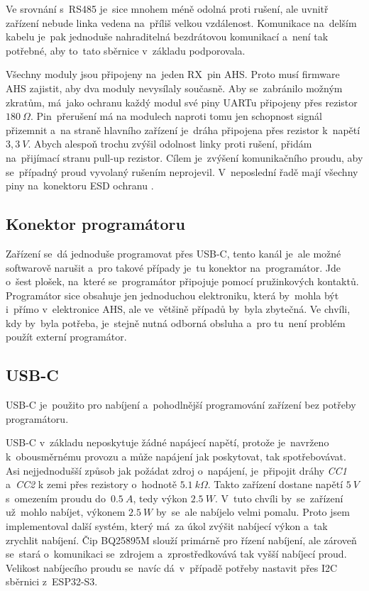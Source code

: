 Ve srovnání s~RS485 je~sice mnohem méně odolná proti rušení, ale uvnitř zařízení nebude linka vedena na~příliš velkou vzdálenost.
Komunikace na~delším kabelu je~pak jednoduše nahraditelná bezdrátovou komunikací a~není tak potřebné, aby to~tato sběrnice v~základu podporovala.

Všechny moduly jsou připojeny na~jeden RX~pin AHS.
Proto musí firmware AHS zajistit, aby dva moduly nevysílaly současně.
Aby se~zabránilo možným zkratům, má~jako ochranu každý modul své piny UARTu připojeny přes rezistor \(180~\Omega\).
Pin~přerušení má na modulech naproti tomu jen schopnost signál přizemnit a~na straně hlavního zařízení je~dráha připojena přes rezistor k~napětí \(3,3~V\).
Abych alespoň trochu zvýšil odolnost linky proti rušení, přidám na~přijímací stranu pull-up rezistor.
Cílem je~zvýšení komunikačního proudu, aby se~případný proud vyvolaný rušením neprojevil.
V~neposlední řadě mají všechny piny na~konektoru ESD ochranu \cite{TPD4E02B04}.

\subsection{Konektor programátoru}
Zařízení se~dá jednoduše programovat přes USB-C, tento kanál je~ale možné softwarově narušit a~pro takové případy je~tu konektor na~programátor.
Jde o~šest plošek, na~které se~programátor připojuje pomocí pružinkových kontaktů.
Programátor sice obsahuje jen jednoduchou elektroniku, která by~mohla být i~přímo v~elektronice AHS, ale ve~většině případů by~byla zbytečná.
Ve chvíli, kdy by~byla potřeba, je~stejně nutná odborná obsluha a~pro tu~není problém použít externí programátor.

\subsection{USB-C}
USB-C je~použito pro nabíjení a~pohodlnější programování zařízení bez potřeby programátoru.

USB-C v~základu neposkytuje žádné napájecí napětí, protože je~navrženo k~obousměrnému provozu a může napájení jak poskytovat, tak spotřebovávat.
Asi nejjednodušší způsob jak požádat zdroj o~napájení, je~připojit dráhy {\it CC1} a~{\it CC2} k zemi přes rezistory o~hodnotě \(5.1~k\Omega\).
Takto zařízení dostane napětí \(5~V\) s~omezením proudu do~\(0.5~A\), tedy výkon \(2.5~W\).
V~tuto chvíli by~se~zařízení už~mohlo nabíjet, výkonem \(2.5~W\) by~se~ale nabíjelo velmi pomalu.
Proto jsem implementoval další systém, který má~za úkol zvýšit nabíjecí výkon a~tak zrychlit nabíjení.
Čip BQ25895M \cite{BQ25895} slouží primárně pro řízení nabíjení, ale zároveň se~stará o~komunikaci se~zdrojem a~zprostředkovává tak vyšší nabíjecí proud.
Velikost nabíjecího proudu se~navíc dá~v~případě potřeby nastavit přes I2C sběrnici z~ESP32-S3.


